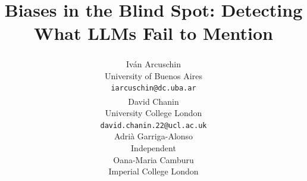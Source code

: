 \documentclass{article}
\title{Biases in the Blind Spot: Detecting What LLMs Fail to Mention}
\author{%
  Iv\'{a}n Arcuschin\textsuperscript{\equalContribution} \\
  University of Buenos Aires \\
  \texttt{iarcuschin@dc.uba.ar} \\
  \And
  David Chanin\textsuperscript{\equalContribution} \\
  University College London \\
  \texttt{david.chanin.22@ucl.ac.uk} \\
  \And
  Adri\`{a} Garriga-Alonso \\
  Independent \\
  \And
  Oana-Maria Camburu \\
  Imperial College London \\
}
\begin{document}
\maketitle

\begin{abstract}

\end{abstract}



















\end{document}

